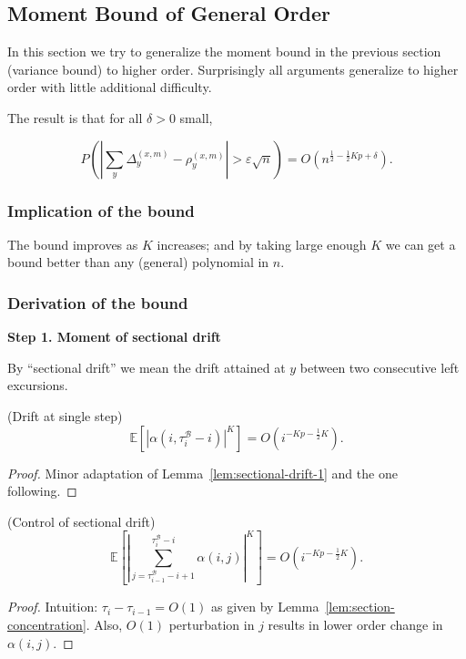
\subsection{Moment Bound of General Order}

In this section we try to generalize the moment bound in the previous section (variance bound) to higher order. Surprisingly all arguments generalize to higher order with little additional difficulty. 

The result is that for all $\delta>0$ small,

\begin{equation*}
	P \left( \left| \sum_y \Delta_y^{(x,m)} - \rho_y^{(x,m)} \right| > \varepsilon \sqrt{n} \right) 
	= O\left( n^{\frac{1}{2}-\frac{1}{2}K p + \delta } \right)
.\end{equation*}


\subsubsection{Implication of the bound}

The bound improves as $K$ increases; and by taking large enough $K$ we can get a bound better than any (general) polynomial in $n$.

\subsubsection{Derivation of the bound}

\textbf{Step 1. Moment of sectional drift}

By ``sectional drift'' we mean the drift attained at $y$ between two consecutive left excursions.

\begin{lemma}
	(Drift at single step)
	\[
		\mathbb{E}\left[ \left| \alpha(i, \tau_i^{\mathcal{B}} - i) \right| ^K \right] 
		= O\left(i^{-Kp - \frac{1}{2}K}\right)
	.\] 
\end{lemma}
\begin{proof}
	Minor adaptation of Lemma~\ref{lem:sectional-drift-1} and the one following.
\end{proof}

\begin{lemma}
	(Control of sectional drift)
	\[
		\mathbb{E}\left[ \left|   
			\sum_{j = \tau_{i-1}^{\mathcal{B}}-i+1}^{\tau_i^{\mathcal{B}}-i}   
			\alpha(i, j) 
		\right| ^K \right]
		= O\left(i^{-Kp - \frac{1}{2}K}\right)
	.\] 
\end{lemma}
\begin{proof}
	Intuition: $\tau_i - \tau_{i-1} = O(1)$ as given by Lemma~\ref{lem:section-concentration}. Also, $O(1)$ perturbation in $j$ results in lower order change in $\alpha(i,j)$.
\end{proof}


